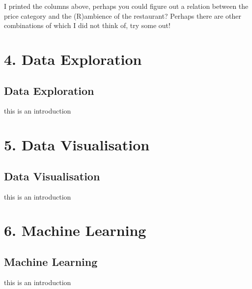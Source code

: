 \documentclass[letterpaper,10pt,english]{jupyterBook}
\begin{document}
\sphinxAtStartPar
I printed the columns above, perhaps you could figure out a relation between the price category and the (R)ambience of the restaurant?
Perhaps there are other combinations of which I did not think of, try some out!


\part{4. Data Exploration}


\chapter{Data Exploration}
\label{\detokenize{c4_data_exploration/introduction:data-exploration}}\label{\detokenize{c4_data_exploration/introduction::doc}}
\sphinxAtStartPar
this is an introduction


\part{5. Data Visualisation}


\chapter{Data Visualisation}
\label{\detokenize{c5_data_visualisation/introduction:data-visualisation}}\label{\detokenize{c5_data_visualisation/introduction::doc}}
\sphinxAtStartPar
this is an introduction


\part{6. Machine Learning}


\chapter{Machine Learning}
\label{\detokenize{c6_machine_learning/introduction:machine-learning}}\label{\detokenize{c6_machine_learning/introduction::doc}}
\sphinxAtStartPar
this is an introduction







\renewcommand{\indexname}{Index}
\printindex
\end{document}
